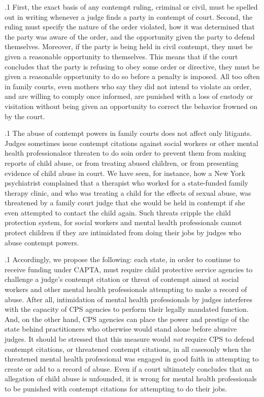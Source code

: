 \documentclass[11pt, twoside]{article}
\begin{document}
{\p.1{%
First, the exact basis of any contempt ruling, criminal or civil, must
be spelled out in writing whenever a judge finds a party in contempt of
court. Second, the ruling must specify the nature of the order violated,
how it was determined that the party was aware of the order, and the opportunity given the party to defend themselves. Moreover, if the party is
being held in civil contempt, they must be given a reasonable opportunity to  themselves. This means that if the court concludes that
the party is refusing to obey some order or directive, they must be
given a reasonable opportunity to do so before a penalty is imposed. All
too often in family courts, even mothers who say they did not intend to
violate an order, and are willing to comply once informed, are punished
with a loss of custody or visitation without being given an opportunity
to correct the behavior frowned on by the court.
}%

\p.1{%
The abuse of contempt powers in family courts does not affect only litigants. Judges sometimes issue contempt citations against social workers
or other mental health professionals\mdash{}or threaten to do so\mdash{}in order to prevent
them from making reports of child abuse, or from treating abused children, or from presenting evidence of child abuse in court. We have seen,
for instance, how a New York psychiatrist complained that a therapist
who worked for a state-funded family therapy clinic, and who was treating a child for the effects of sexual abuse, was threatened by a family
court judge that she would be held in contempt if she even attempted to
contact the child again. Such threats cripple the child protection system, for social workers and mental health professionals cannot protect
children if they are intimidated from doing their jobs by judges who
abuse contempt powers.
}%

\p.1{%
Accordingly, we propose the following: each state, in order to continue to receive funding under CAPTA, must require child protective
service agencies to challenge a judge’s contempt citation or threat of
contempt aimed at social workers and other mental health professionals
attempting to make a record of abuse. After all, intimidation of mental health professionals by judges interferes with the capacity of CPS
agencies to perform their legally mandated function. And, on the other
hand, CPS agencies can place the power and prestige of the state behind
practitioners who otherwise would stand alone before abusive judges. It
should be stressed that this measure would \textit{not} require CPS to defend
contempt citations, or threatened contempt citations, in all cases\mdash{}only
when the threatened mental health professional was engaged in good
faith in attempting to create or add to a record of abuse. Even if a court
ultimately concludes that an allegation of child abuse is unfounded, it
is wrong for mental health professionals to be punished with contempt
citations for attempting to do their jobs.
}%


}
\end{document}
